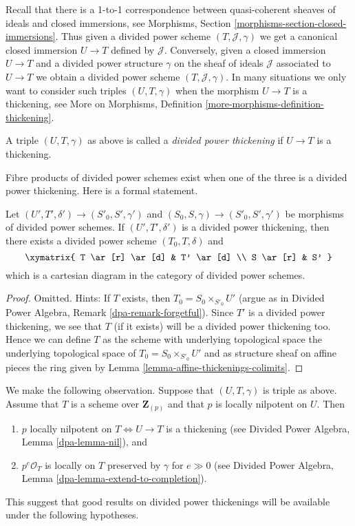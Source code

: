 \noindent
Recall that there is a 1-to-1 correspondence between quasi-coherent
sheaves of ideals and closed immersions, see
Morphisms, Section \ref{morphisms-section-closed-immersions}.
Thus given a divided power scheme $(T, \mathcal{J}, \gamma)$ we
get a canonical closed immersion $U \to T$ defined by $\mathcal{J}$.
Conversely, given a closed immersion $U \to T$ and a divided power
structure $\gamma$ on the sheaf of ideals $\mathcal{J}$ associated
to $U \to T$ we obtain a divided power scheme $(T, \mathcal{J}, \gamma)$.
In many situations we only want to consider such triples
$(U, T, \gamma)$ when the morphism $U \to T$ is a thickening, see
More on Morphisms, Definition \ref{more-morphisms-definition-thickening}.

\begin{definition}
\label{definition-divided-power-thickening}
A triple $(U, T, \gamma)$ as above is called a {\it divided power thickening}
if $U \to T$ is a thickening.
\end{definition}

\noindent
Fibre products of divided power schemes exist when one of the
three is a divided power thickening. Here is a formal statement.

\begin{lemma}
\label{lemma-fibre-product}
Let $(U', T', \delta') \to (S'_0, S', \gamma')$ and
$(S_0, S, \gamma) \to (S'_0, S', \gamma')$ be morphisms of
divided power schemes. If $(U', T', \delta')$ is a divided power
thickening, then there exists a divided power scheme $(T_0, T, \delta)$
and
$$
\xymatrix{
T \ar[r] \ar[d] & T' \ar[d] \\
S \ar[r] & S'
}
$$
which is a cartesian diagram in the category of divided power schemes.
\end{lemma}

\begin{proof}
Omitted. Hints: If $T$ exists, then $T_0 = S_0 \times_{S'_0} U'$
(argue as in Divided Power Algebra, Remark \ref{dpa-remark-forgetful}).
Since $T'$ is a divided power thickening, we see that $T$
(if it exists) will be a divided power thickening too.
Hence we can define $T$ as the scheme with underlying topological
space the underlying topological space of $T_0 = S_0 \times_{S'_0} U'$
and as structure sheaf on affine pieces the ring given
by Lemma \ref{lemma-affine-thickenings-colimits}.
\end{proof}

\noindent
We make the following observation. Suppose that $(U, T, \gamma)$
is triple as above. Assume that $T$ is a scheme over $\mathbf{Z}_{(p)}$
and that $p$ is locally nilpotent on $U$. Then
\begin{enumerate}
\item $p$ locally nilpotent on $T \Leftrightarrow U \to T$
is a thickening (see Divided Power Algebra, Lemma \ref{dpa-lemma-nil}), and
\item $p^e\mathcal{O}_T$ is locally on $T$ preserved by $\gamma$
for $e \gg 0$ (see
Divided Power Algebra, Lemma \ref{dpa-lemma-extend-to-completion}).
\end{enumerate}
This suggest that good results on divided power thickenings will be
available under the following hypotheses.


